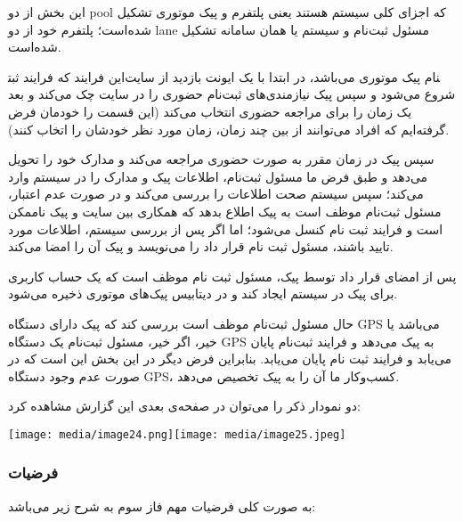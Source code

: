 \documentclass[]{article}
\begin{document}
این بخش از دو pool که اجزای کلی سیستم هستند یعنی پلتفرم و پیک موتوری
تشکیل شده‌است؛ پلتفرم خود از دو lane مسئول ثبت‌نام و سیستم یا همان
سامانه تشکیل شده‌است.

این فرایند که فرایند ثبت‎نام پیک موتوری می‌باشد، در ابتدا با یک ایونت
بازدید از سایت شروع می‌شود و سپس پیک نیازمندی‌های ثبت‌نام حضوری را در
سایت چک می‌کند و بعد یک زمان را برای مراجعه حضوری انتخاب می‌کند (این
قسمت را خودمان فرض گرفته‌ایم که افراد می‌توانند از بین چند زمان، زمان
مورد نظر خودشان را اتخاب کنند).

سپس پیک در زمان مقرر به صورت حضوری مراجعه می‌کند و مدارک خود را تحویل
می‌دهد و طبق فرض ما مسئول ثبت‌نام، اطلاعات پیک و مدارک را در سیستم وارد
می‌کند؛ سپس سیستم صحت اطلاعات را بررسی می‌کند و در صورت عدم اعتبار،
مسئول ثبت‌نام موظف است به پیک اطلاع بدهد که همکاری بین سایت و پیک ناممکن
است و فرایند ثبت نام کنسل می‌شود؛ اما اگر پس از بررسی سیستم، اطلاعات
مورد تایید باشند، مسئول ثبت نام قرار داد را می‌نویسد و پیک آن را امضا
می‌کند.

پس از امضای قرار داد توسط پیک، مسئول ثبت نام موظف است که یک حساب کاربری
برای پیک در سیستم ایجاد کند و در دیتابیس پیک‌های موتوری ذخیره می‌شود.

حال مسئول ثبت‌نام موظف است بررسی کند که پیک دارای دستگاه GPS می‌باشد یا
خیر، اگر خیر، مسئول ثبت‌نام یک دستگاه GPS به پیک می‌دهد و فرایند ثبت‌نام
پایان می‌یابد و فرایند ثبت نام پایان می‌یابد. بنابراین فرض دیگر در این
بخش این است که در صورت عدم وجود دستگاه GPS، کسب‌وکار ما آن را به پیک
تخصیص می‌دهد.

دو نمودار ذکر را می‌توان در صفحه‌ی بعدی این گزارش مشاهده کرد:

\texttt{[image: media/image24.png]}\texttt{[image: media/image25.jpeg]}

\subsubsection{فرضیات}\label{ux641ux631ux636ux6ccux627ux62a-2}

به صورت کلی فرضیات مهم فاز سوم به شرح زیر می‌باشد:
\end{document}
